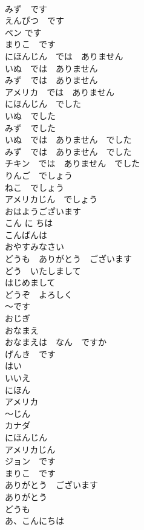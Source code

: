 \documentclass[8pt]{extreport}
\begin{document}
\begin{CJK}{UTF8}{min}
\\	みず　です	
\\	えんぴつ　です	
\\	ペン です	
\\	まりこ　です	
\\	にほんじん　では　ありません	
\\	いぬ　では　ありません	
\\	みず　では　ありません	
\\	アメリカ　では　ありません	
\\	にほんじん　でした	
\\	いぬ　でした	
\\	みず　でした	
\\	いぬ　では　ありません　でした	
\\	みず　では　ありません　でした	
\\	チキン　では　ありません　でした	
\\	りんご　でしょう	
\\	ねこ　でしょう	
\\	アメリカじん　でしょう	
\\	おはようございます	
\\	こん に ちは	
\\	こんばんは	
\\	おやすみなさい	
\\	どうも　ありがとう　ございます	
\\	どう　いたしまして	
\\	はじめまして	
\\	どうぞ　よろしく	
\\	〜です	
\\	おじぎ	
\\	おなまえ	
\\	おなまえは　なん　ですか	
\\	げんき　です	
\\	はい	
\\	いいえ	
\\	にほん	
\\	アメリカ	
\\	〜じん	
\\	カナダ	
\\	にほんじん	
\\	アメリカじん	
\\	ジョン　です	
\\	まりこ　です	
\\	ありがとう　ございます	
\\	ありがとう	
\\	どうも	
\\	あ、こんにちは	

\end{CJK}
\end{document}

